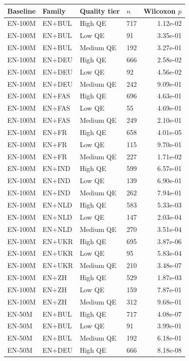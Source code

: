 \begin{tabular}{@{}llllr@{}}
\toprule
Baseline & Family & Quality tier & $n$ & Wilcoxon $p$ \\
\midrule
EN-100M & EN+BUL & High QE & 717 & 1.12e-02 \\
EN-100M & EN+BUL & Low QE & 91 & 3.35e-01 \\
EN-100M & EN+BUL & Medium QE & 192 & 3.27e-01 \\
EN-100M & EN+DEU & High QE & 666 & 2.58e-02 \\
EN-100M & EN+DEU & Low QE & 92 & 4.56e-02 \\
EN-100M & EN+DEU & Medium QE & 242 & 9.09e-01 \\
EN-100M & EN+FAS & High QE & 696 & 4.63e-01 \\
EN-100M & EN+FAS & Low QE & 55 & 4.69e-01 \\
EN-100M & EN+FAS & Medium QE & 249 & 2.10e-01 \\
EN-100M & EN+FR & High QE & 658 & 4.01e-05 \\
EN-100M & EN+FR & Low QE & 115 & 9.70e-01 \\
EN-100M & EN+FR & Medium QE & 227 & 1.71e-02 \\
EN-100M & EN+IND & High QE & 599 & 6.57e-01 \\
EN-100M & EN+IND & Low QE & 139 & 6.90e-01 \\
EN-100M & EN+IND & Medium QE & 262 & 7.94e-01 \\
EN-100M & EN+NLD & High QE & 583 & 5.33e-03 \\
EN-100M & EN+NLD & Low QE & 147 & 2.03e-04 \\
EN-100M & EN+NLD & Medium QE & 270 & 3.51e-04 \\
EN-100M & EN+UKR & High QE & 695 & 3.87e-06 \\
EN-100M & EN+UKR & Low QE & 95 & 5.83e-04 \\
EN-100M & EN+UKR & Medium QE & 210 & 3.48e-07 \\
EN-100M & EN+ZH & High QE & 529 & 1.87e-03 \\
EN-100M & EN+ZH & Low QE & 159 & 7.87e-01 \\
EN-100M & EN+ZH & Medium QE & 312 & 9.68e-01 \\
EN-50M & EN+BUL & High QE & 717 & 4.08e-07 \\
EN-50M & EN+BUL & Low QE & 91 & 3.99e-01 \\
EN-50M & EN+BUL & Medium QE & 192 & 6.18e-01 \\
EN-50M & EN+DEU & High QE & 666 & 8.18e-08 \\

\end{tabular}
